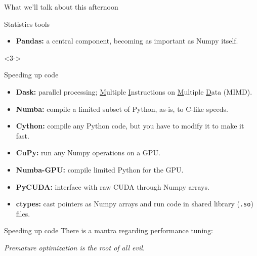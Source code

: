 \documentclass[aspectratio=169]{beamer}
\begin{document}
\begin{frame}{What we'll talk about this afternoon}
\vspace{0.3 cm}
\begin{block}{Statistics tools}
\begin{itemize}
\item {\bf Pandas:} a central component, becoming as important as Numpy itself.
\end{itemize}

\end{block}

\vspace{0.4 cm}
\begin{uncoverenv}<3->
\begin{block}{Speeding up code}
\begin{itemize}
\item {\bf Dask:} parallel processing; \underline{M}ultiple \underline{I}nstructions on \underline{M}ultiple \underline{D}ata (MIMD).
\item {\bf Numba:} compile a limited subset of Python, as-is, to C-like speeds.
\item {\bf Cython:} compile any Python code, but you have to modify it to make it fast.
\item {\bf CuPy:} run any Numpy operations on a GPU.
\item {\bf Numba-GPU:} compile limited Python for the GPU.
\item {\bf PyCUDA:} interface with raw CUDA through Numpy arrays.
\item {\bf ctypes:} cast pointers as Numpy arrays and run code in shared library ({\tt\small *.so}) files.
\end{itemize}
\end{block}
\end{uncoverenv}
\end{frame}

\begin{frame}{Speeding up code}
\large
\vspace{0.5 cm}
There is a mantra regarding performance tuning:
\begin{center}
\it Premature optimization is the root of all evil.
\end{center}

\normalsize
\vspace{0.5 cm}

\vspace{0.5 cm}
\end{frame}
\end{document}
